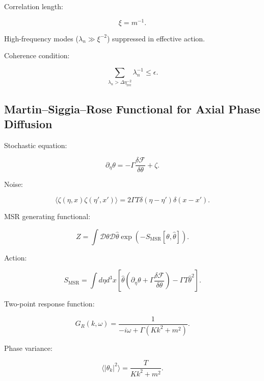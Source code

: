 \documentclass[12pt]{article}
\begin{document}
Correlation length:

\begin{equation}
\xi = m^{-1}.
\end{equation}

High-frequency modes ($\lambda_n \gg \xi^{-2}$) suppressed in effective action.

Coherence condition:

\begin{equation}
\sum_{\lambda_n > \Delta\eta_{\mathrm{rec}}^{-2}}
\lambda_n^{-1}
\le
\epsilon.
\end{equation}

\subsection{Martin--Siggia--Rose Functional for Axial Phase Diffusion}

Stochastic equation:

\begin{equation}
\partial_\eta \theta
=
- \Gamma \frac{\delta \mathcal{F}}{\delta \theta}
+
\zeta.
\end{equation}

Noise:

\begin{equation}
\langle \zeta(\eta,x)\zeta(\eta',x') \rangle
=
2\Gamma T \delta(\eta-\eta')\delta(x-x').
\end{equation}

MSR generating functional:

\begin{equation}
Z
=
\int \mathcal{D}\theta \mathcal{D}\hat{\theta}
\exp
\left(
- S_{\mathrm{MSR}}[\theta,\hat{\theta}]
\right).
\end{equation}

Action:

\begin{equation}
S_{\mathrm{MSR}}
=
\int d\eta d^3x
\left[
\hat{\theta}
\left(
\partial_\eta \theta
+
\Gamma \frac{\delta \mathcal{F}}{\delta \theta}
\right)
-
\Gamma T \hat{\theta}^2
\right].
\end{equation}

Two-point response function:

\begin{equation}
G_R(k,\omega)
=
\frac{1}{-i\omega + \Gamma (Kk^2+m^2)}.
\end{equation}

Phase variance:

\begin{equation}
\langle |\theta_k|^2 \rangle
=
\frac{T}{Kk^2+m^2}.
\end{equation}
\end{document}
